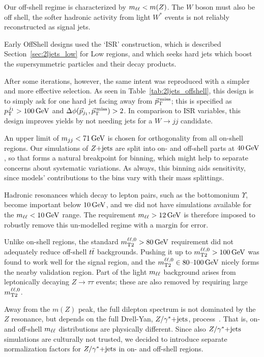 Our off-shell regime is characterized by $\mll < m(Z)$.
The $W$ boson must also be off shell, the softer hadronic activity from
light $W^*$ events is not reliably reconstructed as signal jets.

Early OffShell designs used the `ISR' construction, which is described
Section~\ref{sec:2ljets_low} for Low regions,
and which seeks hard jets which boost the supersymmetric particles and their
decay products.

After some iterations, however, the same intent was reproduced with a simpler
and more effective selection.
As seen in Table~\ref{tab:2ljets_offshell}, this design is to simply ask for
one hard jet facing away from $\ptmiss$; this is specified as
$\ptjone > 100\,\eV[G]$ and $\dphijmet > 2$.
In comparison to ISR variables, this design improves yields by not needing jets
for a $W\rightarrow jj$ candidate.

An upper limit of $\mjj < 71\,\eV[G]$ is chosen for orthogonality from all
on-shell regions.
Our simulations of $\zjets$ are split into on- and off-shell parts at
$40\,\eV[G]$, so that forms a natural breakpoint for binning, which might help
to separate concerns about systematic variations.
As always, this binning aids sensitivity, since models' contributions to the
bins vary with their mass splittings.

Hadronic resonances which decay to lepton pairs,
such as the bottomonium $\Upsilon$,
become important below $10\,\eV[G]$, and we did not have simulations available
for the $\mll < 10\,\eV[G]$ range.
The requirement $\mll > 12\,\eV[G]$ is therefore imposed to robustly remove
this un-modelled regime with a margin for error.

Unlike on-shell regions, the standard $\mttwoll > 80\,\eV[G]$ requirement did
not adequately reduce off-shell $\ttbar$ backgrounds.
Pushing it up to $\mttwoll > 100\,\eV[G]$ was found to work well for the signal
region, and the $\mttwoll \in 80\textrm{--}100\,\eV[G]$ nicely forms the
nearby validation region.
Part of the light $\mll$ background arises from leptonically decaying
$Z\rightarrow \tau\tau$ events; these are also removed by requiring large
$\mttwoll$.

Away from the $m(Z)$ peak, the full dilepton spectrum is not dominated by the
$Z$ resonance, but depends on the full Drell-Yan, $\zyjets$,
process~\cite{drell1970massive}.
That is, on- and off-shell $\mll$ distributions are physically different.
Since also $\zyjets$ simulations are culturally not trusted, we decided
to introduce separate normalization factors for $\zyjets$ in on- and off-shell
regions.

